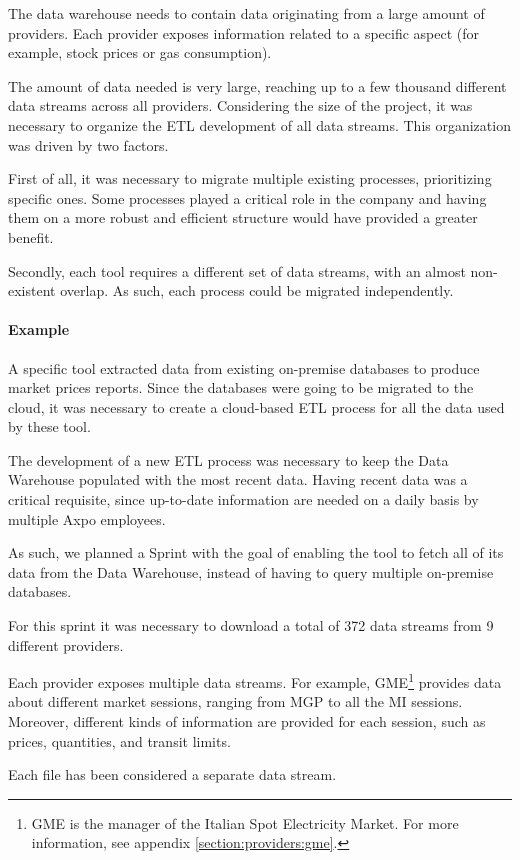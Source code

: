 The data warehouse needs to contain data originating from a large amount of providers.
Each provider exposes information related to a specific aspect (for example, stock prices or gas consumption).

The amount of data needed is very large, reaching up to a few thousand different data streams across all providers.
Considering the size of the project, it was necessary to organize the ETL development of all data streams.
This organization was driven by two factors.

First of all, it was necessary to migrate multiple existing processes, prioritizing specific ones.
Some processes played a critical role in the company and having them on a more robust and efficient structure would have provided a greater benefit.

Secondly, each tool requires a different set of data streams, with an almost non-existent overlap.
As such, each process could be migrated independently.

\paragraph{Example}
    A specific tool extracted data from existing on-premise databases to produce market prices reports.
    Since the databases were going to be migrated to the cloud, it was necessary to create a cloud-based ETL process for all the data used by these tool.
    
    The development of a new ETL process was necessary to keep the Data Warehouse populated with the most recent data.
    Having recent data was a critical requisite, since up-to-date information are needed on a daily basis by multiple Axpo employees.

    As such, we planned a Sprint with the goal of enabling the tool to fetch all of its data from the Data Warehouse, instead of having to query multiple on-premise databases.

    For this sprint it was necessary to download a total of 372 data streams from 9 different providers.
    
    Each provider exposes multiple data streams.
    For example, GME\footnote{
        GME is the manager of the Italian Spot Electricity Market.
        For more information, see appendix \ref{section:providers:gme}.
    } provides data about different market sessions, ranging from MGP to all the MI sessions.
    Moreover, different kinds of information are provided for each session, such as prices, quantities, and transit limits.
    
    Each file has been considered a separate data stream.